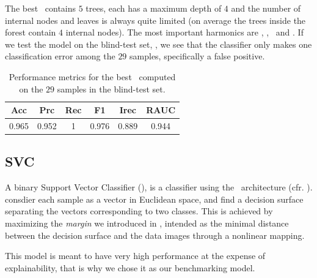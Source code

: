 
The best \rf\ contains $5$ trees, each has a maximum depth of $4$ and the number of
internal nodes and leaves is always quite limited (on average the trees inside the forest contain
$4$ internal nodes). The most important harmonics are \cnmod[2], \cnmod[5], \phin[6]\ and \phin[10].
If we test the model on the blind-test set, \db, we see that the classifier only makes one classification error among the $29$ samples, specifically a false positive.
\begin{table}[!ht]
	\caption{Performance metrics for the best \rf\ computed on the $29$ samples in the
		blind-test set.}\label{tab:qrp-rf-test}

	\bigskip
	\setlength{\tabcolsep}{6pt}
	\centering
	\begin{tabular}{cccccc}
		\toprule
		\textbf{Acc} & \textbf{Prc} & \textbf{Rec} & \textbf{F1} & \textbf{Irec} & \textbf{RAUC} \\
		\midrule
		0.965        & 0.952        & 1            & 0.976       & 0.889         & 0.944         \\
		\bottomrule
	\end{tabular}
\end{table}

\subsection{SVC}
A binary Support Vector Classifier (\svc), is a classifier using the \svm\ architecture (cfr.
). \svcs consdier each sample as a vector in Euclidean space, and find a decision
surface separating the vectors corresponding to two classes. This is achieved by maximizing the
\emph{margin} we introduced in , intended as the minimal distance between the decision
surface and the data images through a nonlinear mapping.

This model is meant to have very high performance at the expense of explainability, that is why we chose it as our benchmarking model.


